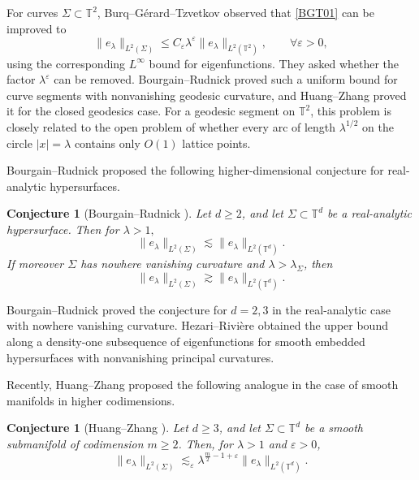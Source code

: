 \documentclass[11pt,reqno]{amsart}
\newtheorem{conjecture}[theorem]{Conjecture}
\numberwithin{equation}{section}
\newcommand{\1}{\textbf{1}}
\newcommand{\eps}{\varepsilon}
\begin{document}
	For curves
	\(\Sigma\subset\mathbb T^2\), Burq--G\'erard--Tzvetkov observed that
	\eqref{BGT01} can be improved to
	\begin{equation}\label{BGTtorus}
		\|e_\lambda\|_{L^2(\Sigma)}
		\le C_\eps\lambda^\eps
		\|e_\lambda\|_{L^2(\mathbb T^2)},
		\qquad \forall \eps>0,
	\end{equation}
	using the corresponding \(L^\infty\) bound for eigenfunctions. They asked whether the factor \(\lambda^\eps\) can be removed. Bourgain--Rudnick
	\cite{BR2011} proved such a uniform bound for curve segments with nonvanishing
	geodesic curvature, and Huang--Zhang \cite[Theorem 2]{hzapde} proved it for
	the closed geodesics case. For a geodesic segment on \(\mathbb T^2\), this problem is closely related to the open problem of whether every
	arc of length \(\lambda^{1/2}\) on the circle \(|x|=\lambda\) contains only
	\(O(1)\) lattice points.
	
	Bourgain--Rudnick proposed the following higher-dimensional conjecture for real-analytic hypersurfaces.
	
	\begin{conjecture}[Bourgain--Rudnick \cite{BR2011}]\label{BRconj}
		Let \(d\ge2\), and let \(\Sigma\subset\mathbb T^d\) be a real-analytic
		hypersurface.  Then for $\lambda>1, $
		\begin{equation}\label{BR01}
			\|e_\lambda\|_{L^2(\Sigma)}
			\lesssim
			\|e_\lambda\|_{L^2(\mathbb T^d)}.
		\end{equation}
		If moreover \(\Sigma\) has nowhere vanishing curvature and
		\(\lambda>\lambda_\Sigma\), then
		\begin{equation}\label{BR02}
			\|e_\lambda\|_{L^2(\Sigma)}
			\gtrsim
			\|e_\lambda\|_{L^2(\mathbb T^d)}.
		\end{equation}
	\end{conjecture}
	
	Bourgain--Rudnick proved the conjecture for \(d=2,3\) in the real-analytic
	case with nowhere vanishing curvature.  Hezari--Rivi\`ere \cite{hr} obtained
	the upper bound along a density-one subsequence of eigenfunctions for smooth
	embedded hypersurfaces with nonvanishing principal curvatures.
	
	Recently, Huang--Zhang \cite{hzapde} proposed the following analogue in the case of smooth manifolds in higher
	codimensions.
	
	\begin{conjecture}[Huang--Zhang \cite{hzapde}]\label{HZconj}
		Let \(d\ge3\), and let \(\Sigma\subset\mathbb T^d\) be a smooth
		submanifold of codimension \(m\ge2\).  Then, for \(\lambda>1 \) and \(\eps>0\),
		\begin{equation}\label{hzeq}
			\|e_\lambda\|_{L^2(\Sigma)}
			\lesssim_\eps
			\lambda^{\frac m2-1+\eps}
			\|e_\lambda\|_{L^2(\mathbb T^d)}.
		\end{equation}
	\end{conjecture}
	
\end{document}
